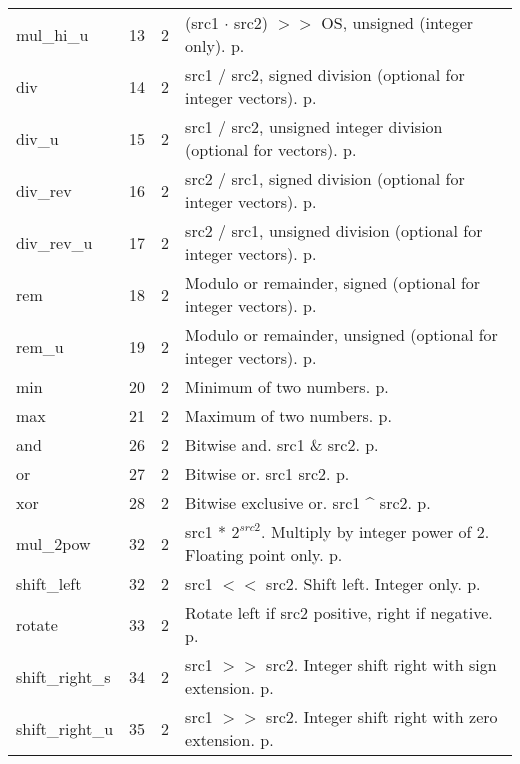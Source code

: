 \documentclass[forwardcom.tex]{subfiles}
\begin{document}
\begin{longtable} {|p{25mm}|p{12mm}|p{12mm}|p{100mm}|}
mul\_hi\_u   & 13 & 2 & (src1 $\cdot$ src2) $>>$ OS, unsigned (integer only). p. \pageref{table:mulHiUInstruction}\\
div          & 14 & 2 & src1 / src2, signed division (optional for integer vectors). p. \pageref{table:divInstruction} \\
div\_u       & 15 & 2 & src1 / src2, unsigned integer division (optional for vectors). p. \pageref{table:divUInstruction}\\
div\_rev     & 16 & 2 & src2 / src1, signed division (optional for integer vectors). p. \pageref{table:divRevInstruction} \\
div\_rev\_u  & 17 & 2 & src2 / src1, unsigned division (optional for integer vectors). p. \pageref{table:divRevUInstruction}\\
rem          & 18 & 2 & Modulo or remainder, signed (optional for integer vectors). p. \pageref{table:remInstruction}\\
rem\_u       & 19 & 2 & Modulo or remainder, unsigned (optional for integer vectors). p. \pageref{table:remUInstruction} \\
min          & 20 & 2 & Minimum of two numbers. p. \pageref{table:minInstruction} \\
max          & 21 & 2 & Maximum of two numbers. p. \pageref{table:maxInstruction}  \\
and          & 26 & 2 & Bitwise and. src1 \& src2. p. \pageref{table:andInstruction}\\
or           & 27 & 2 & Bitwise or. src1 \textbar{} src2. p. \pageref{table:orInstruction}\\
xor          & 28 & 2 & Bitwise exclusive or. src1 \^{} src2. p. \pageref{table:xorInstruction}\\
mul\_2pow    & 32 & 2 & src1 * $2^{src2}$. Multiply by integer power of 2. Floating point only. p. \pageref{table:mul2PowInstruction}\\
shift\_left  & 32 & 2 & src1 $<<$ src2. Shift left. Integer only. p. \pageref{table:shiftLeftInstruction}\\
rotate       & 33 & 2 & Rotate left if src2 positive, right if negative. p. \pageref{table:rotateInstruction}\\
shift\_right\_s & 34 & 2 & src1 $>>$ src2. Integer shift right with sign extension. p. \pageref{table:shiftRightSInstruction}\\
shift\_right\_u & 35 & 2 & src1 $>>$ src2. Integer shift right with zero extension. p. \pageref{table:shiftRightUInstruction}\\

\end{longtable}
\end{document}
